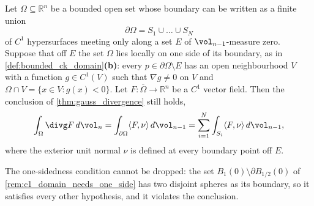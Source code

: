 \begin{theorem}
\label{thm:gauss_divergence_piecewise}
Let $\Omega \subseteq \mathbb{R}^n$ be a bounded open set whose boundary can be written as a
finite union
\[\partial\Omega = S_1 \cup \dots \cup S_N\]
of $C^1$ hypersurfaces meeting only along a set $E$ of $\vol_{n-1}$-measure zero. Suppose that
off $E$ the set $\Omega$ lies locally on one side of its boundary, as in
\cref{def:bounded_ck_domain}\textbf{(b)}: every $p \in \partial\Omega \setminus E$ has an open
neighbourhood $V$ with a function $g \in C^1(V)$ such that $\nabla g \neq 0$ on $V$ and
$\Omega \cap V = \{x \in V : g(x) < 0\}$. Let $F : \overline\Omega \to \mathbb{R}^n$ be a $C^1$
vector field. Then the conclusion of \cref{thm:gauss_divergence} still holds,
\[\int_\Omega \divg F\,d\vol_n = \int_{\partial\Omega} \langle F,\nu\rangle\,d\vol_{n-1}
  = \sum_{i=1}^N \int_{S_i} \langle F,\nu\rangle\,d\vol_{n-1},\]
where the exterior unit normal $\nu$ is defined at every boundary point off $E$.
\end{theorem}

The one-sidedness condition cannot be dropped: the set $B_1(0)\setminus\partial B_{1/2}(0)$ of
\cref{rem:c1_domain_needs_one_side} has two disjoint spheres as its boundary, so it satisfies
every other hypothesis, and it violates the conclusion.

